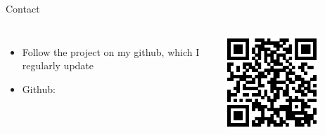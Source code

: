 \documentclass[aspectratio=169,handout]{beamer}
\begin{document}
\begin{frame}{Contact}
\begin{columns}
\begin{itemize}
    \item Follow the project on my github, which I regularly update
    \item Github:
\end{itemize}
\centering
\includegraphics[width=0.7\textwidth]{./github.eps}
\end{columns}
\end{frame}
\end{document}
